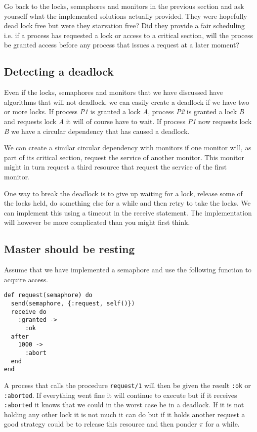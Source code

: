 \documentclass[a4paper,11pt]{article}
\begin{document}
Go back to the locks, semaphores and monitors in the previous section
and ask yourself what the implemented solutions actually provided. They
were hopefully dead lock free but were they starvation free? Did they
provide a fair scheduling i.e. if a process has requested a lock or
access to a critical section, will the process be granted access
before any process that issues a request at a later moment?


\subsection{Detecting a deadlock}

Even if the locks, semaphores and monitors that we have discussed have
algorithms that will not deadlock, we can easily create a deadlock if
we have two or more locks. If process {\em P1} is granted a lock {\em
  A}, process {\em P2} is granted a lock {\em B} and requests lock
{\em A} it will of course have to wait. If process {\em P1} now
requests lock {\em B} we have a circular dependency that has caused a
deadlock.

We can create a similar circular dependency with monitors if one
monitor will, as part of its critical section, request the service of
another monitor. This monitor might in turn request a third resource
that request the service of the first monitor.

One way to break the deadlock is to give up waiting for a lock,
release some of the locks held, do something else for a while and then
retry to take the locks. We can implement this using a timeout in the
receive statement. The implementation will however be more complicated
than you might first think.


\subsection{Master should be resting}

Assume that we have implemented a semaphore and use the following
function to acquire access.

\begin{verbatim}
def request(semaphore) do
  send(semaphore, {:request, self()})
  receive do
    :granted ->
      :ok
  after
    1000 ->
      :abort
  end
end
\end{verbatim}

A process that calls the procedure {\tt request/1} will then be given
the result {\tt :ok} or {\tt :aborted}. If everything went fine it will
continue to execute but if it receives {\tt :aborted} it knows that we
could in the worst case be in a deadlock. If it is not holding any
other lock it is not much it can do but if it holds another request a
good strategy could be to release this resource and then ponder $\pi$
for a while.
\end{document}
